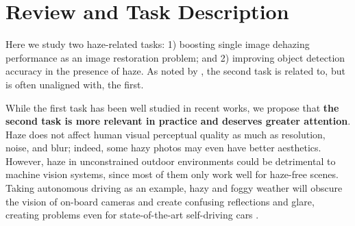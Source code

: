 \documentclass[10pt,twocolumn,letterpaper]{article}
\begin{document}





\section{Review and Task Description}

Here we study two haze-related tasks: 1) boosting single image dehazing performance as an image restoration problem; and 2) improving object detection accuracy in the presence of haze. As noted by \cite{wang2016studying,li2017aod,li2017reside}, the second task is related to, but is often unaligned with, the first.

While the first task has been well studied in recent works, we propose that \textbf{the second task is more relevant in practice and deserves greater attention}. Haze does not affect human visual perceptual quality as much as resolution, noise, and blur; indeed, some hazy photos may even have better aesthetics. However, haze in unconstrained outdoor environments could be detrimental to machine vision systems, since most of them only work well for haze-free scenes. Taking autonomous driving as an example, hazy and foggy weather will obscure the vision of on-board cameras and create confusing reflections and glare, creating problems even for state-of-the-art self-driving cars \cite{li2017reside}.
\end{document}
